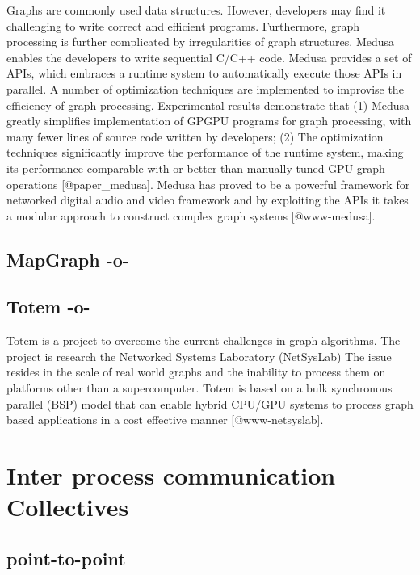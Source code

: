 Graphs are commonly used data structures. However, developers may find
it challenging to write correct and efficient programs. Furthermore,
graph processing is further complicated by irregularities of graph
structures. Medusa enables the developers to write sequential C/C++
code. Medusa provides a set of APIs, which embraces a runtime system
to automatically execute those APIs in parallel\cite{paper_medusa}.  A
number of optimization techniques are implemented to improvise the
efficiency of graph processing. Experimental results demonstrate that
(1) Medusa greatly simplifies implementation of GPGPU programs for
graph processing, with many fewer lines of source code written by
developers; (2) The optimization techniques significantly improve the
performance of the runtime system, making its performance comparable
with or better than manually tuned GPU graph
operations [@paper_medusa]. Medusa has proved to be a powerful
framework for networked digital audio and video framework and by
exploiting the APIs it takes a modular approach to construct complex
graph systems [@www-medusa].



\subsection{MapGraph -o-}



\subsection{Totem -o-}

Totem is a project to overcome the current challenges in graph
algorithms.  The project is research the Networked Systems Laboratory
(NetSysLab) The issue resides in the scale of real world graphs and
the inability to process them on platforms other than a supercomputer.
Totem is based on a bulk synchronous parallel (BSP) model that can
enable hybrid CPU/GPU systems to process graph based applications in a
cost effective manner [@www-netsyslab].




\section{Inter process communication Collectives}


\subsection{point-to-point}
